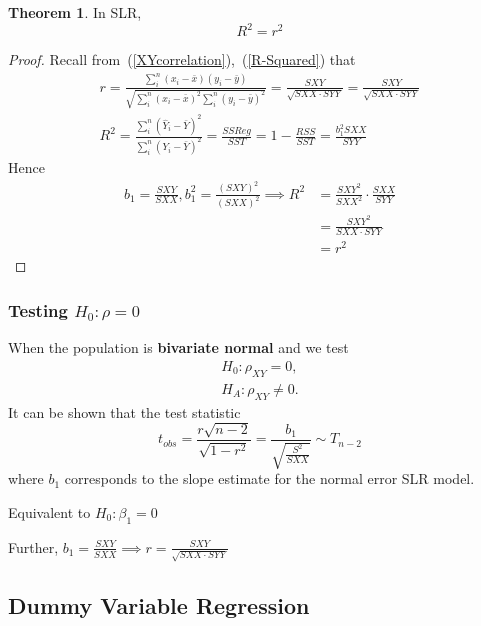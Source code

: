 \documentclass[11pt]{article}
\theoremstyle{definition}
\newtheorem{theorem}{Theorem}[section]
\numberwithin{equation}{section}
\begin{document}
\begin{theorem}
In SLR,
  \begin{equation}R^2 = r^2\end{equation}
\end{theorem}
\begin{proof}
  Recall from~(\ref{XYcorrelation}),~(\ref{R-Squared}) that
  \begin{gather*}
    r = \frac{\sum^n_{i}(x_i - \bar{x})(y_i - \bar{y})}{\sqrt{\sum^n_i(x_i - \bar{x})^2\sum^n_i(y_i - \bar{y})^2}}=\frac{SXY}{\sqrt{SXX\cdot SYY}} = \frac{SXY}{\sqrt{SXX\cdot SYY}}\\
    R^2 = \frac{\sum^n_i(\hat{Y}_i - \bar{Y})^2}{\sum^n_i(Y_i - \bar{Y})^2} = \frac{SSReg}{SST} = 1 - \frac{RSS}{SST} = \frac{b_1^2SXX}{SYY}
  \end{gather*}
  Hence 
  \begin{align*}
    b_1 = \frac{SXY}{SXX}, b_1^2 = \frac{(SXY)^2}{(SXX)^2} \implies R^2 &= \frac{SXY^2}{SXX^2}\cdot\frac{SXX}{SYY}\\ 
    &= \frac{SXY^2}{SXX\cdot SYY}\\
    &= r^2
  \end{align*}

\end{proof}

\subsubsection{Testing $H_0:\rho = 0$}

When the population is \textbf{bivariate normal} and we test
\begin{gather*}
  H_0:\rho_{XY} = 0,\\
  H_A:\rho_{XY} \neq 0.
\end{gather*}
It can be shown that the test statistic
\begin{equation}
  t_{obs} = \frac{r\sqrt{n - 2}}{\sqrt{1 - r^2}} = \frac{b_1}{\sqrt{\frac{S^2}{SXX}}}\sim T_{n-2}
\end{equation}
where $b_1$ corresponds to the slope estimate for the normal error SLR model.
\begin{writenotes}
  Equivalent to $H_0:\beta_1 = 0$

  Further, $b_1 = \frac{SXY}{SXX}\implies r = \frac{SXY}{\sqrt{SXX\cdot SYY}}$
\end{writenotes}

\subsection{Dummy Variable Regression}
\end{document}
